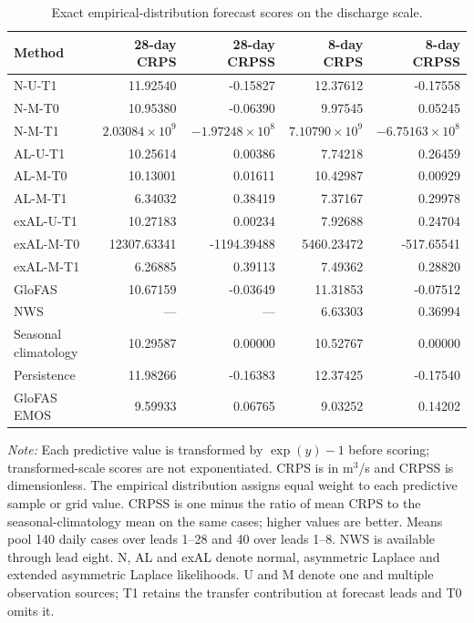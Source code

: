 \begin{table}[!htbp]
\centering
\begin{threeparttable}
\caption{Exact empirical-distribution forecast scores on the discharge scale.}
\label{tab:no_refit_original_scale}
\fontsize{8.5}{10.5}\selectfont
\setlength{\tabcolsep}{4pt}
\begin{tabular}{lrrrr}
\hline
Method & 28-day CRPS & 28-day CRPSS & 8-day CRPS & 8-day CRPSS \\
\hline
N-U-T1 & 11.92540 & -0.15827 & 12.37612 & -0.17558 \\
N-M-T0 & 10.95380 & -0.06390 & 9.97545 & 0.05245 \\
N-M-T1 & $2.03084\times 10^{9}$ & $-1.97248\times 10^{8}$ & $7.10790\times 10^{9}$ & $-6.75163\times 10^{8}$ \\
AL-U-T1 & 10.25614 & 0.00386 & 7.74218 & 0.26459 \\
AL-M-T0 & 10.13001 & 0.01611 & 10.42987 & 0.00929 \\
AL-M-T1 & 6.34032 & 0.38419 & 7.37167 & 0.29978 \\
exAL-U-T1 & 10.27183 & 0.00234 & 7.92688 & 0.24704 \\
exAL-M-T0 & 12307.63341 & -1194.39488 & 5460.23472 & -517.65541 \\
exAL-M-T1 & 6.26885 & 0.39113 & 7.49362 & 0.28820 \\
GloFAS & 10.67159 & -0.03649 & 11.31853 & -0.07512 \\
NWS & --- & --- & 6.63303 & 0.36994 \\
Seasonal climatology & 10.29587 & 0.00000 & 10.52767 & 0.00000 \\
Persistence & 11.98266 & -0.16383 & 12.37425 & -0.17540 \\
GloFAS EMOS & 9.59933 & 0.06765 & 9.03252 & 0.14202 \\
\hline
\end{tabular}
\begin{tablenotes}
\fontsize{8}{10}\selectfont
\item \textit{Note:} Each predictive value is transformed by $\exp(y)-1$ before scoring; transformed-scale scores are not exponentiated. CRPS is in m$^3$/s and CRPSS is dimensionless. The empirical distribution assigns equal weight to each predictive sample or grid value. CRPSS is one minus the ratio of mean CRPS to the seasonal-climatology mean on the same cases; higher values are better. Means pool 140 daily cases over leads 1--28 and 40 over leads 1--8. NWS is available through lead eight. N, AL and exAL denote normal, asymmetric Laplace and extended asymmetric Laplace likelihoods. U and M denote one and multiple observation sources; T1 retains the transfer contribution at forecast leads and T0 omits it.
\end{tablenotes}
\end{threeparttable}
\end{table}
